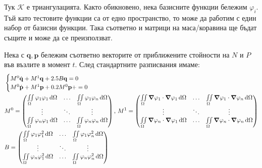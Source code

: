 \documentclass[bulgarian, 12pt]{article}
\begin{document}
\begin{large}
Тук $\mathcal{K}$ е триангулацията. 
Както обикновено, нека базисните функции бележим $\varphi_i$. 
Тъй като тестовите функции са от едно пространство, то може да работим с един набор от базисни функции.
Така съответно и матрици на маса/коравина ще бъдат същите и може да се преизползват.

Нека с $\mathbf{q}, \mathbf{p}$ бележим съответно векторите от приближените стойности на $N$ и $P$ във възлите в момент $t$.
След стандартните разписвания имаме: 
\begin{align*}
  &\begin{cases}
	  M^0\dot{\mathbf{q}} + M^1\mathbf{q} + 2.5 B\mathbf{q} = 0 \\
    M^0\dot{\mathbf{p}} + M^1\mathbf{p} + 0.2 M^0\mathbf{p} + = 0 \\
	\end{cases} \\
  &M^0=\begin{pmatrix}
	\iint\limits_{\Omega} \varphi_1 \varphi_1 \,\dd\Omega & \hdots & \iint\limits_{\Omega} \varphi_1 \varphi_n \,\dd\Omega \\
	\vdots & \ddots & \vdots \\
	\iint\limits_{\Omega} \varphi_n \varphi_1 \,\dd\Omega & \hdots & \iint\limits_{\Omega} \varphi_n \varphi_n \,\dd\Omega \\
	\end{pmatrix},\,
  M^1=\begin{pmatrix}
	\iint\limits_{\Omega} \grad \varphi_1 \cdot \grad \varphi_1 \,\dd\Omega & \hdots & \iint\limits_{\Omega} \grad \varphi_1 \cdot \grad \varphi_n \,\dd\Omega \\
	\vdots & \ddots & \vdots \\
	\iint\limits_{\Omega} \grad \varphi_n \cdot \grad \varphi_1 \,\dd\Omega & \hdots & \iint\limits_{\Omega} \grad \varphi_n \cdot \grad \varphi_n \,\dd\Omega \\
	\end{pmatrix}\\
  &B=\begin{pmatrix}
    \iint\limits_{\Omega} \varphi_1 \varphi_1^2 \,\dd\Omega & \hdots & \iint\limits_{\Omega} \varphi_1 \varphi_n^2 \,\dd\Omega \\
    \vdots & \ddots & \vdots \\
    \iint\limits_{\Omega} \varphi_n \varphi_1^2 \,\dd\Omega & \hdots & \iint\limits_{\Omega} \varphi_n \varphi_n^2 \,\dd\Omega \\
    \end{pmatrix}  
\end{align*}


\end{large}
\end{document}

